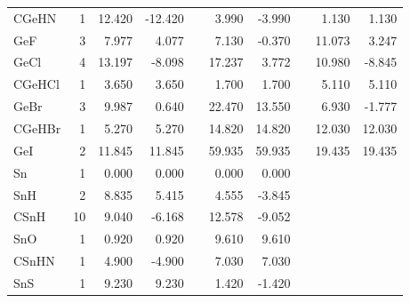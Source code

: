 \begin{table}
\begin{center}
\begin{tabular}{lrrrrrrrrr}
      CGeHN   &      1 &   12.420 &  -12.420 &  &    3.990 &   -3.990 &  &    1.130 &    1.130 \\
      GeF     &      3 &    7.977 &    4.077 &  &    7.130 &   -0.370 &  &   11.073 &    3.247 \\
      GeCl    &      4 &   13.197 &   -8.098 &  &   17.237 &    3.772 &  &   10.980 &   -8.845 \\
      CGeHCl  &      1 &    3.650 &    3.650 &  &    1.700 &    1.700 &  &    5.110 &    5.110 \\
      GeBr    &      3 &    9.987 &    0.640 &  &   22.470 &   13.550 &  &    6.930 &   -1.777 \\
      CGeHBr  &      1 &    5.270 &    5.270 &  &   14.820 &   14.820 &  &   12.030 &   12.030 \\
      GeI     &      2 &   11.845 &   11.845 &  &   59.935 &   59.935 &  &   19.435 &   19.435 \\
  Sn        &   1 &    0.000 &    0.000 &     &    0.000 &    0.000 &     &          &          \\
  SnH       &   2 &    8.835 &    5.415 &     &    4.555 &   -3.845 &     &          &          \\
  CSnH      &  10 &    9.040 &   -6.168 &     &   12.578 &   -9.052 &     &          &          \\
  SnO       &   1 &    0.920 &    0.920 &     &    9.610 &    9.610 &     &          &          \\
  CSnHN     &   1 &    4.900 &   -4.900 &     &    7.030 &    7.030 &     &          &          \\
  SnS       &   1 &    9.230 &    9.230 &     &    1.420 &   -1.420 &     &          &          \\
\hline
\end{tabular}
\end{center}
\end{table}

